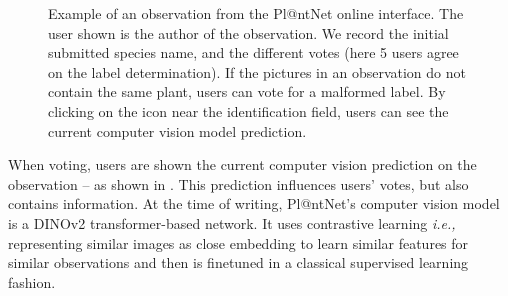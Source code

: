 \begin{figure}[H]
\begin{minipage}{.4\linewidth}
        \end{minipage}\par\medskip
            \caption{Example of an observation from the Pl@ntNet online interface. The user shown is the author of the observation. We record the initial submitted species name, and the different votes (here 5 users agree on the label determination). If  the pictures in an observation do not contain the same plant, users can vote for a malformed label. By clicking on the icon near the identification field, users can see the current computer vision model prediction.}
    \label{fig:interface-plantnet}
\end{figure}

When voting, users are shown the current computer vision prediction on the observation -- as shown in . This prediction influences users' votes, but also contains information.
At the time of writing, Pl@ntNet's computer vision model is a DINOv2 \citep{oquab2024dinov2} transformer-based network.
It uses contrastive learning \citep{waida2023understanding} \emph{i.e.,} representing similar images as close embedding to learn similar features for similar observations and then is finetuned in a classical supervised learning fashion.

